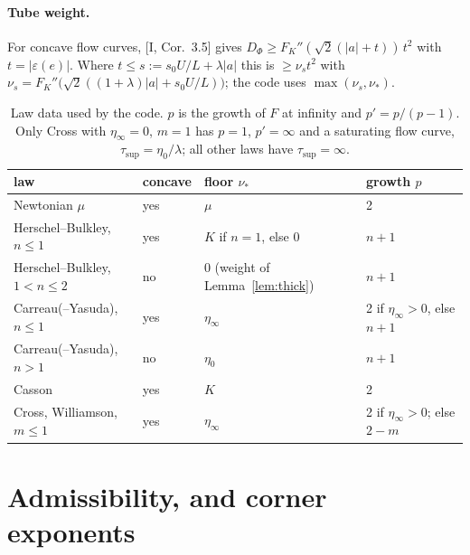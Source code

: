 \documentclass[11pt]{article}
\theoremstyle{definition}
\newcommand{\eps}{\varepsilon}
\begin{document}
\paragraph{Tube weight.} For concave flow curves, [I, Cor.~3.5] gives $D_\Phi\ge F_K''(\sqrt2(|a|+t))\,t^2$ with
$t=|\eps(e)|$. Where $t\le s:=s_0U/L+\lambda|a|$ this is $\ge\nu_s t^2$ with
$\nu_s=F_K''\big(\sqrt2((1+\lambda)|a|+s_0U/L)\big)$; the code uses $\max(\nu_s,\nu_*)$.

\begin{table}[h]\centering\small
\begin{tabular}{llll}\toprule
law & concave & floor $\nu_*$ & growth $p$\\\midrule
Newtonian $\mu$ & yes & $\mu$ & 2\\
Herschel--Bulkley, $n\le1$ & yes & $K$ if $n=1$, else 0 & $n+1$\\
Herschel--Bulkley, $1<n\le2$ & no & 0 (weight of Lemma~\ref{lem:thick}) & $n+1$\\
Carreau(--Yasuda), $n\le1$ & yes & $\eta_\infty$ & 2 if $\eta_\infty>0$, else $n+1$\\
Carreau(--Yasuda), $n>1$ & no & $\eta_0$ & $n+1$\\
Casson & yes & $K$ & 2\\
Cross, Williamson, $m\le1$ & yes & $\eta_\infty$ & 2 if $\eta_\infty>0$; else $2-m$\\\bottomrule
\end{tabular}
\caption{Law data used by the code. $p$ is the growth of $F$ at infinity and $p'=p/(p-1)$. Only Cross with $\eta_\infty=0$, $m=1$ has $p=1$, $p'=\infty$ and a saturating flow curve, $\tau_{\sup}=\eta_0/\lambda$; all other laws have $\tau_{\sup}=\infty$.}
\end{table}

\section{Admissibility, and corner exponents}
\end{document}

